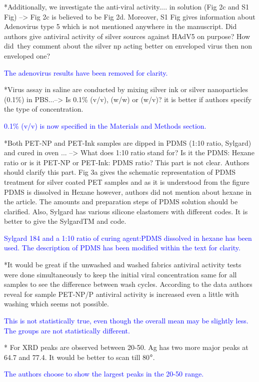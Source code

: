 \documentclass[12pt]{letter}
\newcommand{\blue}[1]{\textcolor{blue}{#1}} %
\begin{document}
*Additionally, we investigate the anti-viral activity.... in solution (Fig 2c and S1 Fig) --> Fig 2c is believed to be Fig 2d. Moreover, S1 Fig gives information about Adenovirus type 5 which is not mentioned anywhere in the manuscript. Did authors give antiviral activity of silver sources against HAdV5 on purpose? How did\ they comment about the silver np acting better on enveloped virus then non enveloped one?

\blue{The adenovirus results have been removed for clarity. }

*Virus assay in saline are conducted by mixing silver ink or silver nanoparticles (0.1\%) in PBS...--> Is 0.1\% (v/v), (w/w) or (w/v)? it is better if authors specify the type of concentration.

\blue{0.1\% (v/v) is now specified in the Materials and Methods section. }

*Both PET-NP and PET-Ink samples are dipped in PDMS (1:10 ratio, Sylgard) and cured in oven ... --> What does 1:10 ratio stand for? Is it the PDMS: Hexane ratio or is it PET-NP or PET-Ink: PDMS ratio? This part is not clear. Authors should clarify this part. Fig 3a gives the schematic representation of PDMS treatment for silver coated PET samples and as it is understood from the figure PDMS is dissolved in Hexane however, authors did not mention about hexane in the article. The amounts and preparation steps of PDMS solution should be clarified. Also, Sylgard has various silicone elastomers with different codes. It is better to give the SylgardTM and code.

\blue{Sylgard 184 and a 1:10 ratio of curing agent:PDMS dissolved in hexane has been used. The description of PDMS has been modified within the text for clarity. }

*It would be great if the unwashed and washed fabrics antiviral activity tests were done simultaneously to keep the initial viral concentration same for all samples to see the difference between wash cycles. According to the data authors reveal for sample PET-NP/P antiviral activity is increased even a little with washing which seems not possible.

\blue{This is not statistically true, even though the overall mean may be slightly less. The groups are not statistically different.}

* For XRD peaks are observed between 20-50. Ag has two more major peaks at 64.7 and 77.4. It would be better to scan till 80$\degree$.

\blue{The authors choose to show the largest peaks in the 20-50 range. }
\end{document}
